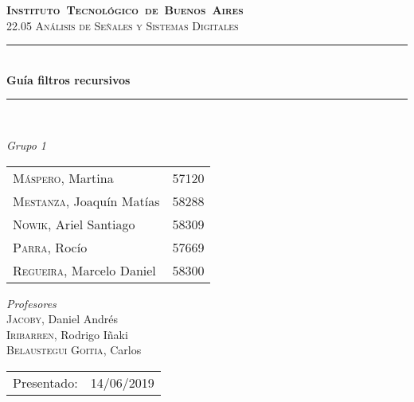 \begin{titlepage}
\newcommand{\HRule}{\rule{\linewidth}{0.5mm}}
\center
\mbox{\textsc{\LARGE \bfseries {Instituto Tecnológico de Buenos Aires}}}\\[1.5cm]
\textsc{\Large 22.05 Análisis de Señales y Sistemas Digitales}\\[0.5cm]


\HRule \\[0.6cm]
{ \Huge \bfseries Guía filtros recursivos}\\[0.4cm] %
\HRule \\[1.5cm]


{\large

\emph{Grupo 1}\\
\vspace{3px}

\begin{tabular}{lr} 	
\textsc{Máspero}, Martina  & 57120 \\
\textsc{Mestanza}, Joaqu\'in Mat\'ias  & 58288 \\
\textsc{Nowik}, Ariel Santiago  & 58309 \\
\textsc{Parra}, Roc\'io  & 57669 \\
\textsc{Regueira}, Marcelo Daniel  & 58300 \\
\end{tabular}

\vspace{20px}

\emph{Profesores}\\
\vspace{3px}
\textsc{Jacoby}, Daniel Andr\'es\\ 	
\textsc{Iribarren}, Rodrigo I\~naki\\ 	
\textsc{Belaustegui Goitia}, Carlos\\ 	

\vspace{100px}

\begin{tabular}{ll}

Presentado: & 14/06/2019\\

\end{tabular}

}

\vfill

\end{titlepage}